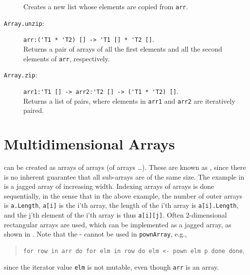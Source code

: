 \documentclass[fsharpNotes.tex]{subfiles}
\begin{document}
\begin{description}
  Creates a new list whose elements are copied from \lstinline{arr}.
\item[\texttt{Array.unzip}:] \lstinline{arr:('T1 * 'T2) [] -> 'T1 [] * 'T2 []}.~\\
  Returns a pair of arrays of all the first elements and all the second elements of \lstinline{arr}, respectively.
\item[\texttt{Array.zip}:] \lstinline{arr1:'T1 [] -> arr2:'T2 [] -> ('T1 * 'T2) []}.~\\
  Returns a list of pairs, where elements in \lstinline{arr1} and \lstinline{arr2} are iteratively paired.
\end{description}

\section{Multidimensional Arrays}
 can be created as arrays of arrays (of arrays \dots). These are known as , since there is no inherent guarantee that all sub-arrays are of the same size. The example in  is a jagged array of increasing width.
%
%
Indexing arrays of arrays is done sequentially, in the sense that in the above example, the number of outer arrays is \lstinline|a.Length|,  \lstinline|a[i]| is the i'th array, the length of the i'th array is \lstinline|a[i].Length|, and the j'th element of the i'th array is thus \lstinline|a[i][j]|. Often 2-dimensional rectangular arrays are used, which can be implemented as a jagged array, as shown in .
%
%
Note that the - cannot be used in \lstinline!pownArray!, e.g., 
\begin{quote} 
  \mbox{\lstinline{for row in arr do for elm in row do elm <- pown elm p done done}},
 \end{quote}
since the iterator value \lstinline!elm! is not mutable, even though \lstinline!arr! is an array.
\end{document}
